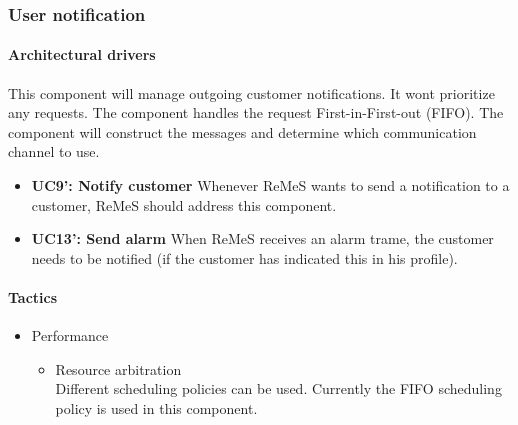 \subsubsection{User notification}
\paragraph{Architectural drivers}
This component will manage outgoing customer notifications. It wont prioritize
	any requests. The component handles the request First-in-First-out (FIFO).
The component will construct the messages and determine which communication channel
		to use.
\begin{itemize}
	\item \textbf{UC9': Notify customer}
	Whenever ReMeS wants to send a notification to a customer, ReMeS should
		address this component.
	\item \textbf{UC13': Send alarm}
	When ReMeS receives an alarm trame, the customer needs to be notified (if
		the customer has indicated this in his profile).
\end{itemize}


\paragraph{Tactics}
\begin{itemize}
	\item Performance
	\begin{itemize}
		\item Resource arbitration\\
		Different scheduling policies can be used. Currently the FIFO scheduling policy is used in this component.
	\end{itemize}
\end{itemize}


